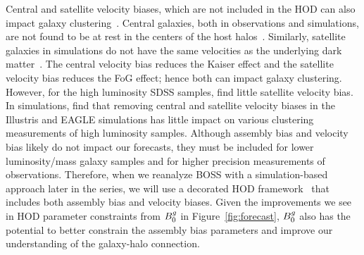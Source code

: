 Central and satellite velocity biases, which are not included in the
\cite{zheng07} HOD can also impact galaxy clustering~\citep{guo2015a,guo2015}. 
Central galaxies, both in observations and simulations, are not found to be 
at rest in the centers of the host 
halos~\citep[\eg][]{berlind2003, yoshikawa2003, vandenbosch2005, skibba2011}. 
Similarly, satellite galaxies in simulations do not have the same velocities as
the underlying dark matter~\citep[\eg][]{diemand2004, gao2004, lau2010,
munari2013, wu2013}. The central velocity bias reduces the Kaiser effect and
the satellite velocity bias reduces the FoG effect; hence both can impact
galaxy clustering. However, for the high luminosity SDSS samples,
\cite{guo2015} find little satellite velocity bias.
In simulations, \cite{beltz-mohrmann2020} find that removing central and
satellite velocity biases in the Illustris and EAGLE simulations has
little impact on various clustering measurements of high luminosity
samples. Although assembly bias and velocity bias likely do not impact our 
forecasts, they must be included for lower luminosity/mass galaxy samples 
and for higher precision measurements of observations. Therefore, when 
we reanalyze BOSS with a simulation-based approach later in the series,
we will use a decorated HOD framework~\citep[\eg][]{hearin2016, vakili2019,
zhai2019} that includes both assembly bias and velocity biases. 
Given the improvements we see in HOD parameter constraints from $B^g_0$ in
Figure~\ref{fig:forecast}, $B^g_0$ also has the potential to better
constrain the assembly bias parameters and improve our understanding of the 
galaxy-halo connection. 

